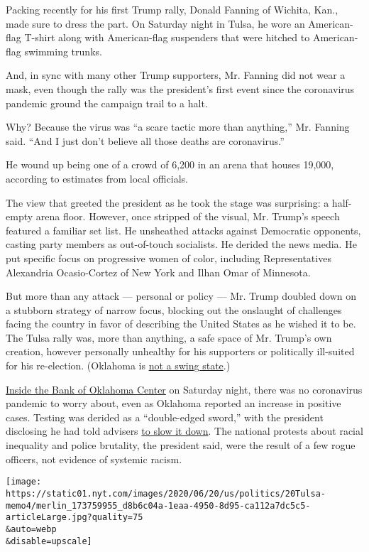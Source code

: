 Packing recently for his first Trump rally, Donald Fanning of Wichita,
Kan., made sure to dress the part. On Saturday night in Tulsa, he wore
an American-flag T-shirt along with American-flag suspenders that were
hitched to American-flag swimming trunks.

And, in sync with many other Trump supporters, Mr. Fanning did not wear
a mask, even though the rally was the president's first event since the
coronavirus pandemic ground the campaign trail to a halt.

Why? Because the virus was ``a scare tactic more than anything,'' Mr.
Fanning said. ``And I just don't believe all those deaths are
coronavirus.''

He wound up being one of a crowd of 6,200 in an arena that houses
19,000, according to estimates from local officials.

The view that greeted the president as he took the stage was surprising:
a half-empty arena floor. However, once stripped of the visual, Mr.
Trump's speech featured a familiar set list. He unsheathed attacks
against Democratic opponents, casting party members as out-of-touch
socialists. He derided the news media. He put specific focus on
progressive women of color, including Representatives Alexandria
Ocasio-Cortez of New York and Ilhan Omar of Minnesota.

But more than any attack --- personal or policy --- Mr. Trump doubled
down on a stubborn strategy of narrow focus, blocking out the onslaught
of challenges facing the country in favor of describing the United
States as he wished it to be. The Tulsa rally was, more than anything, a
safe space of Mr. Trump's own creation, however personally unhealthy for
his supporters or politically ill-suited for his re-election. (Oklahoma
is \href{https://www.nytimes.com/elections/2016/results/oklahoma}{not a
swing state}.)

\href{https://www.nytimes.com/2020/06/20/us/politics/tulsa-trump-rally.html}{Inside
the Bank of Oklahoma Center} on Saturday night, there was no coronavirus
pandemic to worry about, even as Oklahoma reported an increase in
positive cases. Testing was derided as a ``double-edged sword,'' with
the president disclosing he had told advisers
\href{https://www.nytimes.com/2020/06/20/us/politics/tulsa-trump-rally.html}{to
slow it down}. The national protests about racial inequality and police
brutality, the president said, were the result of a few rogue officers,
not evidence of systemic racism.

\texttt{[image: https://static01.nyt.com/images/2020/06/20/us/politics/20Tulsa-memo4/merlin\_173759955\_d8b6c04a-1eaa-4950-8d95-ca112a7dc5c5-articleLarge.jpg?quality=75\\\&auto=webp\\\&disable=upscale]}


